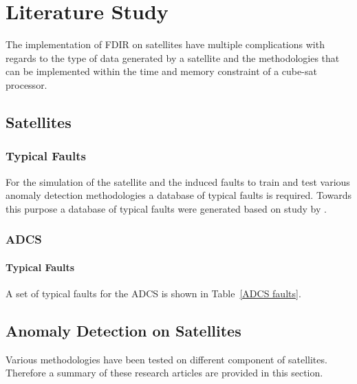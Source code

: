 \chapter{Literature Study}
\vspace{-2em}
\minitoc

\startarabicpagenumbering %


The implementation of FDIR on satellites have multiple complications with regards to the type of data generated by a satellite and the methodologies that can be implemented within the time and memory constraint of a cube-sat processor.

\section{Satellites}

\subsection{Typical Faults}
For the simulation of the satellite and the induced faults to train and test various anomaly detection methodologies a database of typical faults is required. Towards this purpose a database of typical faults were generated based on study by \textcite{tafazoli2009study}. 

\subsection{ADCS}

\subsubsection{Typical Faults}
A set of typical faults for the ADCS is shown in Table~\ref{ADCS faults}.


\section{Anomaly Detection on Satellites}
Various methodologies have been tested on different component of satellites. Therefore a summary of these research articles are provided in this section.

